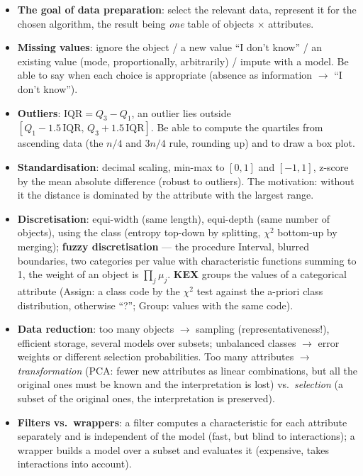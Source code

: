 \documentclass[11pt,a4paper]{article}
\theoremstyle{definition}
\providecommand{\uv}[1]{``#1''}
\begin{document}
\begin{itemize}
\item \textbf{The goal of data preparation}: select the relevant data, represent it for the
      chosen algorithm, the result being \emph{one} table of objects $\times$ attributes.
\item \textbf{Missing values}: ignore the object / a new value \uv{I don't know} / an existing
      value (mode, proportionally, arbitrarily) / impute with a model. Be able to say when each
      choice is appropriate (absence as information $\to$ \uv{I don't know}).
\item \textbf{Outliers}: $\mathrm{IQR}=Q_3-Q_1$, an outlier lies outside
      $[Q_1-1.5\,\mathrm{IQR},\,Q_3+1.5\,\mathrm{IQR}]$. Be able to compute the quartiles from
      ascending data (the $n/4$ and $3n/4$ rule, rounding up) and to draw a box plot.
\item \textbf{Standardisation}: decimal scaling, min-max to $[0,1]$ and $[-1,1]$, z-score by the
      mean absolute difference (robust to outliers). The
      motivation: without it the distance is dominated by the attribute with the largest range.
\item \textbf{Discretisation}: equi-width (same length), equi-depth (same number of objects),
      using the class (entropy top-down by splitting, $\chi^2$ bottom-up by merging);
      \textbf{fuzzy discretisation} --- the procedure Interval, blurred boundaries, two
      categories per value with characteristic functions summing to 1, the weight of an
      object is $\prod_j\mu_j$. \textbf{KEX} groups the values of a categorical attribute
      (Assign: a class code by the $\chi^2$ test against the a-priori class distribution,
      otherwise \uv{?}; Group: values with the same code).
\item \textbf{Data reduction}: too many objects $\to$ sampling (representativeness!), efficient
      storage, several models over subsets; unbalanced classes $\to$ error weights or different
      selection probabilities. Too many attributes $\to$ \emph{transformation} (PCA: fewer new
      attributes as linear combinations, but all the original ones must be known and the
      interpretation is lost) vs.\ \emph{selection} (a subset of the original ones, the
      interpretation is preserved).
\item \textbf{Filters vs.\ wrappers}: a filter computes a characteristic for each attribute
      separately and is independent of the model (fast, but blind to interactions); a wrapper
      builds a model over a subset and evaluates it (expensive, takes interactions into account).

\end{itemize}
\end{document}

